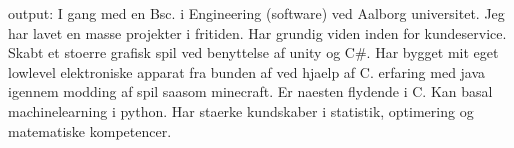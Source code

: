 output: I gang med en Bsc. i Engineering (software) ved Aalborg universitet.
Jeg har lavet en masse projekter i fritiden.
Har grundig viden inden for kundeservice.
Skabt et stoerre grafisk spil ved benyttelse af unity og C#.
Har bygget mit eget lowlevel elektroniske apparat fra bunden af ved hjaelp af C.
erfaring med java igennem modding af spil saasom minecraft.
Er naesten flydende i C.
Kan basal machinelearning i python.
Har staerke kundskaber i statistik, optimering og matematiske kompetencer.

